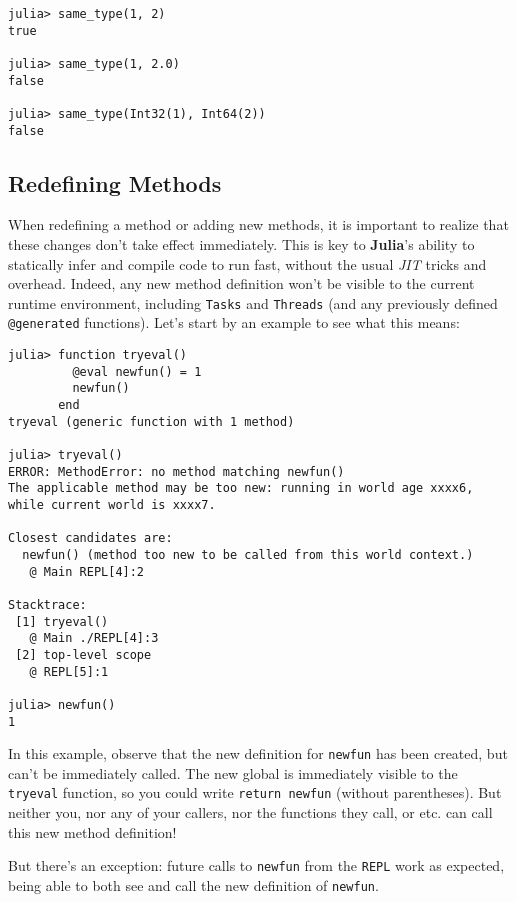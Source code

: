 \documentclass[
]{article}
\begin{document}
\begin{verbatim}
julia> same_type(1, 2)
true

julia> same_type(1, 2.0)
false

julia> same_type(Int32(1), Int64(2))
false
\end{verbatim}

\hypertarget{redefining-methods}{%
\subsection{Redefining Methods}\label{redefining-methods}}

When redefining a method or adding new methods, it is important to
realize that these changes don't take effect immediately. This is key to
\textbf{Julia}'s ability to statically infer and compile code to run
fast, without the usual \emph{JIT} tricks and overhead. Indeed, any new
method definition won't be visible to the current runtime environment,
including \texttt{Tasks} and \texttt{Threads} (and any previously
defined \texttt{@generated} functions). Let's start by an example to see
what this means:

\begin{verbatim}
julia> function tryeval()
         @eval newfun() = 1
         newfun()
       end
tryeval (generic function with 1 method)

julia> tryeval()
ERROR: MethodError: no method matching newfun()
The applicable method may be too new: running in world age xxxx6, while current world is xxxx7.

Closest candidates are:
  newfun() (method too new to be called from this world context.)
   @ Main REPL[4]:2

Stacktrace:
 [1] tryeval()
   @ Main ./REPL[4]:3
 [2] top-level scope
   @ REPL[5]:1

julia> newfun()
1
\end{verbatim}

In this example, observe that the new definition for \texttt{newfun} has
been created, but can't be immediately called. The new global is
immediately visible to the \texttt{tryeval} function, so you could write
\texttt{return\ newfun} (without parentheses). But neither you, nor any
of your callers, nor the functions they call, or etc. can call this new
method definition!

But there's an exception: future calls to \texttt{newfun} from the
\texttt{REPL} work as expected, being able to both see and call the new
definition of \texttt{newfun}.
\end{document}
